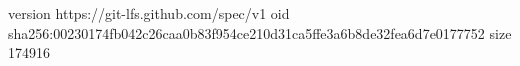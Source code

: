 version https://git-lfs.github.com/spec/v1
oid sha256:00230174fb042c26caa0b83f954ce210d31ca5ffe3a6b8de32fea6d7e0177752
size 174916
